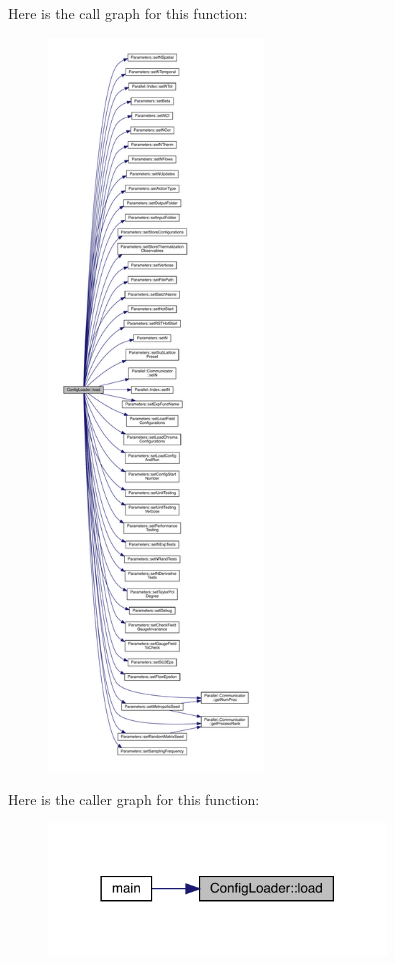 Here is the call graph for this function\+:\nopagebreak
\begin{figure}[H]
\begin{center}
\leavevmode
\includegraphics[height=550pt]{namespace_config_loader_a26cf01adba9411ef1fa006d5068d7cc4_cgraph}
\end{center}
\end{figure}
Here is the caller graph for this function\+:\nopagebreak
\begin{figure}[H]
\begin{center}
\leavevmode
\includegraphics[width=254pt]{namespace_config_loader_a26cf01adba9411ef1fa006d5068d7cc4_icgraph}
\end{center}
\end{figure}
